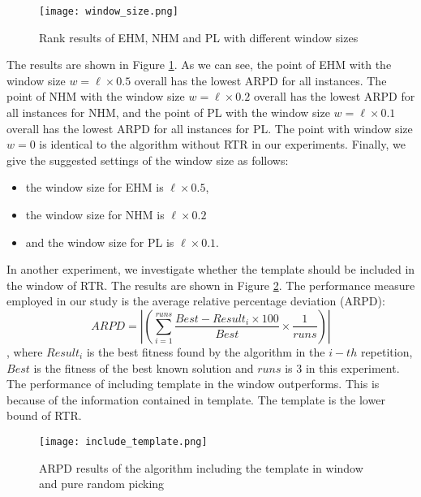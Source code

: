 \begin{figure}[htbp] 
        \centering
        \texttt{[image: window\_size.png]}
        \caption{ Rank results of EHM, NHM and PL with different window sizes } 
        \label{fig:w_size}
\end{figure}



The results are shown in Figure \ref{fig:w_size}. As we can see, the point of EHM with the window size $w=\ell\times 0.5$ overall has the lowest ARPD for all instances. The point of NHM with the window size $w=\ell\times 0.2$ overall has the lowest ARPD for all instances for NHM, and the point of PL with the window size $w=\ell\times 0.1$ overall has the lowest ARPD for all instances for PL. The point with window size $w=0$ is identical to the algorithm without RTR in our experiments. Finally, we give the suggested settings of the window size as follows:
\begin{itemize}
    \item the window size for EHM is $\ell\times 0.5$,
    \item the window size for NHM is $\ell\times 0.2$
    \item and the window size for PL is $\ell\times 0.1$.
\end{itemize}




In another experiment, we investigate whether the template should be included in the window of RTR. The results are shown in Figure \ref{fig:w_template}. The performance measure employed in our study is the average relative percentage deviation (ARPD):\[ARPD=\left|\left(\sum_{i=1}^{runs}\frac{Best-Result_i\times 100}{Best} \times \frac{1}{runs}\right)\right|\], where $Result_i$ is the best fitness found by the algorithm in the $i-th$ repetition, $Best$ is the fitness of the best known solution and $runs$ is 3 in this experiment. The performance of including template in the window outperforms. This is because of the information contained in template. The template is the lower bound of RTR.


\begin{figure}[htbp] 
        \centering
        \texttt{[image: include\_template.png]}
            \caption{ARPD results of the algorithm including the template in window and pure random picking} 
        \label{fig:w_template}
\end{figure}
